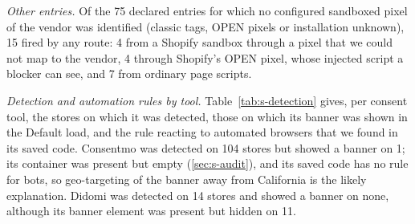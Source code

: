 \documentclass[preprint,11pt,authoryear,a4paper]{elsarticle}
\begin{document}
\emph{Other entries.} Of the 75 declared entries for which no configured sandboxed pixel of the vendor was identified (classic tags, OPEN pixels or installation unknown), 15 fired by any route: 4 from a Shopify sandbox through a pixel that we could not map to the vendor, 4 through Shopify's OPEN pixel, whose injected script a blocker can see, and 7 from ordinary page scripts.

\emph{Detection and automation rules by tool.} Table~\ref{tab:s-detection} gives, per consent tool, the stores on which it was detected, those on which its banner was shown in the Default load, and the rule reacting to automated browsers that we found in its saved code. Consentmo was detected on 104 stores but showed a banner on 1; its container was present but empty (\ref{sec:s-audit}), and its saved code has no rule for bots, so geo-targeting of the banner away from California is the likely explanation. Didomi was detected on 14 stores and showed a banner on none, although its banner element was present but hidden on 11.

\begin{table}[!htbp]
\centering
\caption{Consent tools detected in the Default load (tools detected on at least 5 stores): stores on which the tool was detected, on which its banner was shown, and on which its banner element was present but hidden, with the rule reacting to automated browsers that we found in the tool's saved code (``code not saved'': no copy of the tool's code was kept).}
\label{tab:s-detection}
\footnotesize
{}
\end{table}
\end{document}
